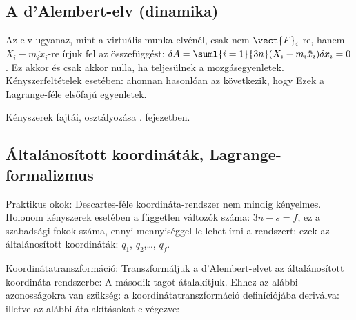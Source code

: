   \subsection{A d'Alembert-elv (dinamika)}\label{ss1:dalembert}
   
   Az elv ugyanaz, mint a virtuális munka elvénél, csak nem $\vect{F}_i$-re, hanem $X_i-m_i\ddot{x}_i$-re írjuk fel az összefüggést: $\delta A = \suml{i=1}{3n}(X_i-m_i\ddot{x}_i)\delta x_i=0$.
   Ez akkor és csak akkor nulla, ha teljesülnek a mozgásegyenletek.
   Kényszerfeltételek esetében:
   ahonnan hasonlóan az következik, hogy 
   Ezek a Lagrange-féle elsőfajú egyenletek. 
   
   Kényszerek fajtái, osztályozása . fejezetben.

  \subsection{Általánosított koordináták, Lagrange-formalizmus}\label{ss1:lagrange2}
   
   Praktikus okok: Descartes-féle koordináta-rendszer nem mindig kényelmes.
   Holonom kényszerek esetében a független változók száma: $3n-s=f$, ez a szabadsági fokok száma, ennyi mennyiséggel le lehet írni a rendszert: ezek az általánosított koordináták: $q_1$, $q_2$,\dots, $q_f$. 
   
   Koordinátatranszformáció:
   Transzformáljuk a d'Alembert-elvet az általánosított koordináta-rendszerbe:
   A második tagot átalakítjuk.
   Ehhez az alábbi azonosságokra van szükség: a koordinátatranszformáció definíciójába deriválva:
   illetve az alábbi átalakításokat elvégezve:
   

